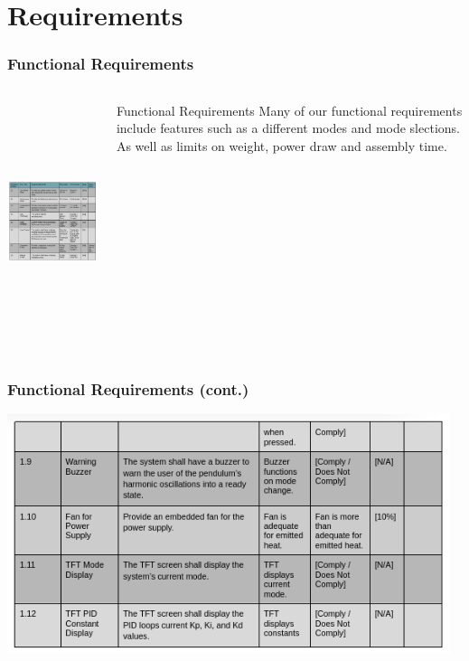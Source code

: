 \documentclass[aspectratio=169]{beamer}
\begin{document}
\section{Requirements}
\begin{frame}
    \frametitle{Functional Requirements}

    \begin{columns}
        \begin{column}{0.70\textwidth}
            \includegraphics[height=7cm]{Functional1}
        \end{column}

        \begin{column}{0.28\textwidth}
            \begin{block}{Functional Requirements}
                Many of our functional requirements include features such as
                a different modes and mode slections. As well as limits on
                weight, power draw and assembly time.
            \end{block}
        \end{column}
    \end{columns}

\end{frame}

\begin{frame}
    \frametitle{Functional Requirements (cont.)}

    \includegraphics[height=7cm]{Functional2}

\end{frame}
\end{document}
